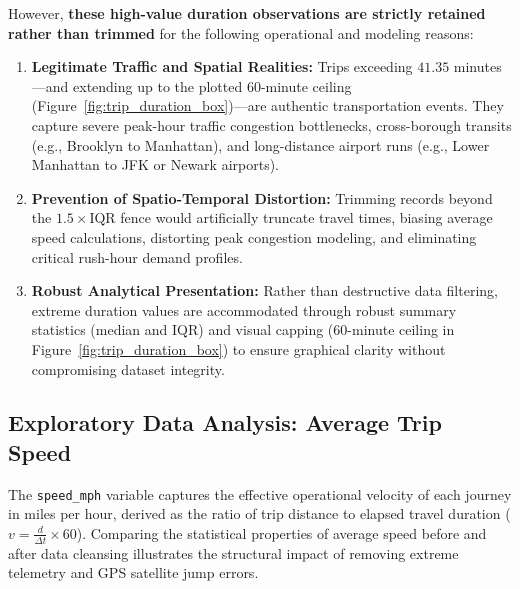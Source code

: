 \documentclass[11pt,a4paper]{article}
\begin{document}
However, \textbf{these high-value duration observations are strictly retained rather than trimmed} for the following operational and modeling reasons:
\begin{enumerate}
    \item \textbf{Legitimate Traffic and Spatial Realities:} Trips exceeding $41.35$ minutes—and extending up to the plotted $60$-minute ceiling (Figure~\ref{fig:trip_duration_box})—are authentic transportation events. They capture severe peak-hour traffic congestion bottlenecks, cross-borough transits (e.g., Brooklyn to Manhattan), and long-distance airport runs (e.g., Lower Manhattan to JFK or Newark airports).
    \item \textbf{Prevention of Spatio-Temporal Distortion:} Trimming records beyond the $1.5 \times \text{IQR}$ fence would artificially truncate travel times, biasing average speed calculations, distorting peak congestion modeling, and eliminating critical rush-hour demand profiles.
    \item \textbf{Robust Analytical Presentation:} Rather than destructive data filtering, extreme duration values are accommodated through robust summary statistics (median and IQR) and visual capping ($60$-minute ceiling in Figure~\ref{fig:trip_duration_box}) to ensure graphical clarity without compromising dataset integrity.
\end{enumerate}

\subsection{Exploratory Data Analysis: Average Trip Speed}
\label{sec:eda_trip_speed}

The \texttt{speed\_mph} variable captures the effective operational velocity of each journey in miles per hour, derived as the ratio of trip distance to elapsed travel duration ($v = \frac{d}{\Delta t} \times 60$). Comparing the statistical properties of average speed before and after data cleansing illustrates the structural impact of removing extreme telemetry and GPS satellite jump errors.
\end{document}
